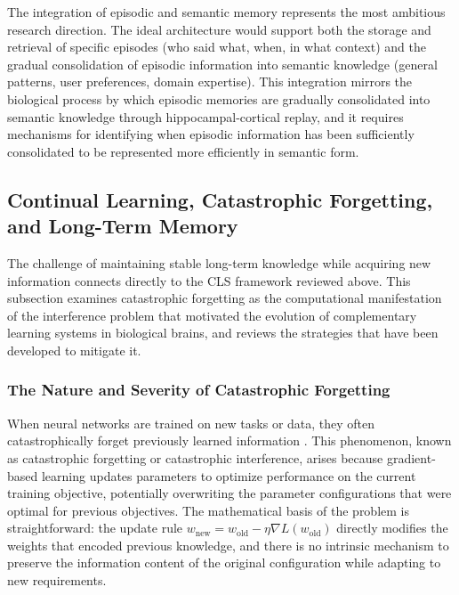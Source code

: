 \documentclass[11pt,letterpaper]{article}
\begin{document}
The integration of episodic and semantic memory represents the most ambitious research direction. The ideal architecture would support both the storage and retrieval of specific episodes (who said what, when, in what context) and the gradual consolidation of episodic information into semantic knowledge (general patterns, user preferences, domain expertise). This integration mirrors the biological process by which episodic memories are gradually consolidated into semantic knowledge through hippocampal-cortical replay, and it requires mechanisms for identifying when episodic information has been sufficiently consolidated to be represented more efficiently in semantic form.

\subsection{Continual Learning, Catastrophic Forgetting, and Long-Term Memory}

The challenge of maintaining stable long-term knowledge while acquiring new information connects directly to the CLS framework reviewed above. This subsection examines catastrophic forgetting as the computational manifestation of the interference problem that motivated the evolution of complementary learning systems in biological brains, and reviews the strategies that have been developed to mitigate it.

\subsubsection{The Nature and Severity of Catastrophic Forgetting}

When neural networks are trained on new tasks or data, they often catastrophically forget previously learned information \cite{luo2023empirical}. This phenomenon, known as catastrophic forgetting or catastrophic interference, arises because gradient-based learning updates parameters to optimize performance on the current training objective, potentially overwriting the parameter configurations that were optimal for previous objectives. The mathematical basis of the problem is straightforward: the update rule $w_{\text{new}} = w_{\text{old}} - \eta \nabla L(w_{\text{old}})$ directly modifies the weights that encoded previous knowledge, and there is no intrinsic mechanism to preserve the information content of the original configuration while adapting to new requirements.
\end{document}
